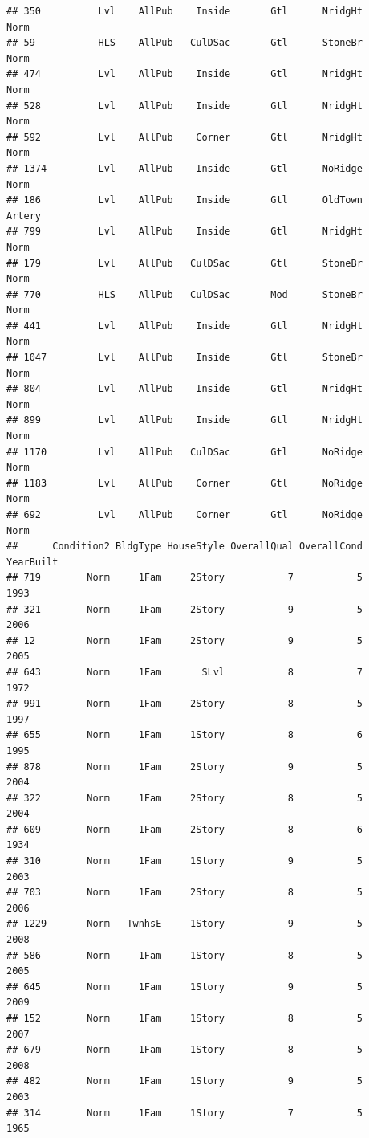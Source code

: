 \documentclass[]{article}
\begin{document}
\begin{verbatim}
## 350          Lvl    AllPub    Inside       Gtl      NridgHt       Norm
## 59           HLS    AllPub   CulDSac       Gtl      StoneBr       Norm
## 474          Lvl    AllPub    Inside       Gtl      NridgHt       Norm
## 528          Lvl    AllPub    Inside       Gtl      NridgHt       Norm
## 592          Lvl    AllPub    Corner       Gtl      NridgHt       Norm
## 1374         Lvl    AllPub    Inside       Gtl      NoRidge       Norm
## 186          Lvl    AllPub    Inside       Gtl      OldTown     Artery
## 799          Lvl    AllPub    Inside       Gtl      NridgHt       Norm
## 179          Lvl    AllPub   CulDSac       Gtl      StoneBr       Norm
## 770          HLS    AllPub   CulDSac       Mod      StoneBr       Norm
## 441          Lvl    AllPub    Inside       Gtl      NridgHt       Norm
## 1047         Lvl    AllPub    Inside       Gtl      StoneBr       Norm
## 804          Lvl    AllPub    Inside       Gtl      NridgHt       Norm
## 899          Lvl    AllPub    Inside       Gtl      NridgHt       Norm
## 1170         Lvl    AllPub   CulDSac       Gtl      NoRidge       Norm
## 1183         Lvl    AllPub    Corner       Gtl      NoRidge       Norm
## 692          Lvl    AllPub    Corner       Gtl      NoRidge       Norm
##      Condition2 BldgType HouseStyle OverallQual OverallCond YearBuilt
## 719        Norm     1Fam     2Story           7           5      1993
## 321        Norm     1Fam     2Story           9           5      2006
## 12         Norm     1Fam     2Story           9           5      2005
## 643        Norm     1Fam       SLvl           8           7      1972
## 991        Norm     1Fam     2Story           8           5      1997
## 655        Norm     1Fam     1Story           8           6      1995
## 878        Norm     1Fam     2Story           9           5      2004
## 322        Norm     1Fam     2Story           8           5      2004
## 609        Norm     1Fam     2Story           8           6      1934
## 310        Norm     1Fam     1Story           9           5      2003
## 703        Norm     1Fam     2Story           8           5      2006
## 1229       Norm   TwnhsE     1Story           9           5      2008
## 586        Norm     1Fam     1Story           8           5      2005
## 645        Norm     1Fam     1Story           9           5      2009
## 152        Norm     1Fam     1Story           8           5      2007
## 679        Norm     1Fam     1Story           8           5      2008
## 482        Norm     1Fam     1Story           9           5      2003
## 314        Norm     1Fam     1Story           7           5      1965

\end{verbatim}
\end{document}
